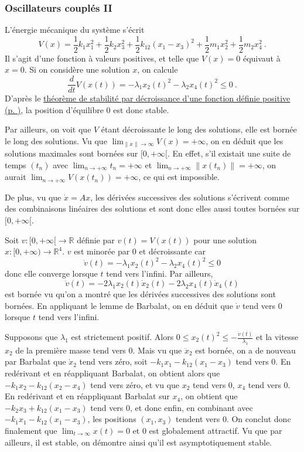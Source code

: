 \hypertarget{answer-ressort-2}{%
\subsubsection*{Oscillateurs couplés II}\label{answer-ressort-2}}


L'énergie mécanique du système s'écrit \[
V(x)
= \frac{1}{2} k_1 x_1^2 + \frac{1}{2} k_2 x_3^2 + \frac{1}{2} k_{12} (x_1-x_3)^2 + \frac{1}{2} m_1 x_2^2 + \frac{1}{2} m_2 x_4^2 \ .
\] Il s'agit d'une fonction à valeurs positives, et telle que \(V(x)=0\)
équivaut à \(x=0\). Si on considère une solution \(x\), on calcule \[
\frac{d}{dt} V(x(t)) = -\lambda_1 x_2(t)^2 - \lambda_2 x_4(t)^2 \leq 0 \ .
\] D'après le \protect\hyperlink{stab_decroissance}{théorème de
stabilité par décroissance d'une fonction définie positive (p.
\pageref*{stab_decroissance})}, la position d'équilibre 0 est donc
stable.

Par ailleurs, on voit que \(V\) étant décroissante le long des
solutions, elle est bornée le long des solutions. Vu que
\(\lim_{\|x\|\to \infty} V(x)=+\infty\), on en déduit que les solutions
maximales sont bornées sur \([0,+\infty[\). En effet, s'il existait une
suite de temps \((t_n)\) avec \(\lim_{n\to +\infty} t_n=+\infty\) et
\(\lim_{n\to +\infty} \|x(t_n)\|=+\infty\), on aurait
\(\lim_{n\to +\infty} V(x(t_n))=+\infty\), ce qui est impossible.

De plus, vu que \(\dot x = Ax\), les dérivées successives des solutions
s'écrivent comme des combinaisons linéaires des solutions et sont donc
elles aussi toutes bornées sur \([0,+\infty[\).

Soit \(v:[0,+\infty[\to \mathbb{R}\) définie par \(v(t) = V(x(t))\) pour
une solution \(x:[0,+\infty)\to \mathbb{R}^4\). \(v\) est minorée par 0 et
décroissante car \[
\dot{v}(t) = -\lambda_1 x_2(t)^2 - \lambda_2 x_4(t)^2 \leq 0
\] donc elle converge lorsque \(t\) tend vers l'infini. Par ailleurs, \[
\ddot{v}(t) = -2\lambda_1 x_2(t)\dot{x}_2(t) - 2\lambda_2 x_4(t)\dot{x}_4(t) 
\] est bornée vu qu'on a montré que les dérivées successives des
solutions sont bornées. En appliquant le lemme de Barbalat, on en déduit
que \(\dot{v}\) tend vers 0 lorsque \(t\) tend vers l'infini.

Supposons que \(\lambda_1\) est strictement positif. Alors
\(0\leq x_2(t)^2\leq -\frac{\dot{v}(t)}{\lambda_1}\) et la vitesse
\(x_2\) de la première masse tend vers 0. Mais vu que \(\ddot{x}_2\) est
bornée, on a de nouveau par Barbalat que \(\dot x_2\) tend vers zéro,
soit \(- k_1 x_1 - k_{12} (x_1 - x_3)\) tend vers 0. En redérivant et en
réappliquant Barbalat, on obtient alors que
\(- k_1 x_2 - k_{12} (x_2 - x_4)\) tend vers zéro, et vu que \(x_2\)
tend vers 0, \(x_4\) tend vers 0. En redérivant et en réappliquant
Barbalat sur \(x_4\), on obtient que \(- k_2 x_3 + k_{12} (x_1 - x_3)\)
tend vers 0, et donc enfin, en combinant avec
\(- k_1 x_1 - k_{12} (x_1 - x_3)\), les positions \((x_1,x_3)\) tendent
vers 0. On conclut donc finalement que \(\lim_{t\to \infty}x(t) = 0\)
et 0 est globalement attractif. Vu que par ailleurs, il est stable, on
démontre ainsi qu'il est asymptotiquement stable.

